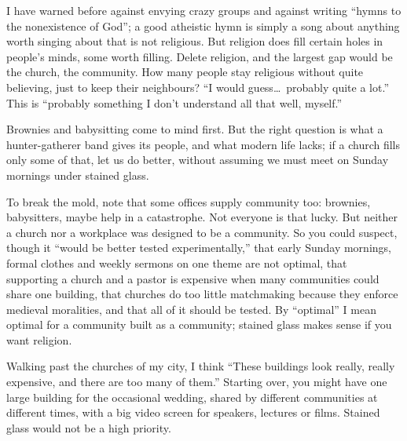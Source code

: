 
I have warned before against envying crazy groups and against writing ``hymns to the nonexistence of God''; a good atheistic hymn is simply a song about anything worth singing about that is not religious. But religion does fill certain holes in people's minds, some worth filling. Delete religion, and the largest gap would be the church, the community. How many people stay religious without quite believing, just to keep their neighbours? ``I would guess\ldots\ probably quite a lot.'' This is ``probably something I don't understand all that well, myself.''

Brownies and babysitting come to mind first. But the right question is what a hunter-gatherer band gives its people, and what modern life lacks; if a church fills only some of that, let us do better, without assuming we must meet on Sunday mornings under stained glass. 

To break the mold, note that some offices supply community too: brownies, babysitters, maybe help in a catastrophe. Not everyone is that lucky. But neither a church nor a workplace was designed to be a community. So you could suspect, though it ``would be better tested experimentally,'' that early Sunday mornings, formal clothes and weekly sermons on one theme are not optimal, that supporting a church and a pastor is expensive when many communities could share one building, that churches do too little matchmaking because they enforce medieval moralities, and that all of it should be tested. By ``optimal'' I mean optimal for a community built as a community; stained glass makes sense if you want religion.

Walking past the churches of my city, I think ``These buildings look really, really expensive, and there are too many of them.'' Starting over, you might have one large building for the occasional wedding, shared by different communities at different times, with a big video screen for speakers, lectures or films. Stained glass would not be a high priority. 

